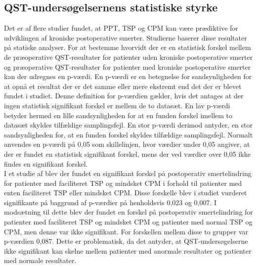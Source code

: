 \subsection{QST-undersøgelsernens statistiske styrke}
Det er af flere studier fundet, at PPT, TSP og CPM kan være prædiktive for udviklingen af kroniske postoperative smerter. \citep{Wylde2016} \citep{Petersen2016} Studierne baserer disse resultater på statiske analyser. For at bestemme hvorvidt der er en statistisk forskel mellem de præoperative QST-resultater for patienter uden kroniske postoperative smerter og præoperative QST-resultater for patienter med kroniske postoperative smerter kan der udregnes en p-værdi. En p-værdi er en betegnelse for sandsynligheden for at opnå et resultat der er det samme eller mere ekstremt end det der er blevet fundet i studiet. Denne definition for p-værdien gælder, hvis det antages at der ingen statistisk signifikant forskel er mellem de to datasæt. En lav p-værdi betyder hermed en lille sandsynligheden for at en funden forskel imellem to datasæt skyldes tilfældige samplingsfejl. En stor p-værdi derimod antyder, en stor sandsynligheden for, at en funden forskel skyldes tilfældige samplingsfejl. Normalt anvendes en p-værdi på 0,05 som skillelinjen, hvor værdier under 0,05 angiver, at der er fundet en statistisk signifikant forskel, mens der ved værdier over 0,05 ikke findes en signifikant forskel. \citep{Zar2010} \\
I et studie af  blev der fundet en signifikant forskel på postoperativ smertelindring for patienter med faciliteret TSP og mindsket CPM i forhold til patienter med enten faciliteret TSP eller mindsket CPM. Disse forskelle blev i studiet vurderet signifikante på baggrund af p-værdier på henholdsvis 0,023 og 0,007. I modsætning til dette blev der fundet en forskel på postoperativ smertelindring for patienter med faciliteret TSP og mindsket CPM og patienter med normal TSP og CPM, men denne var ikke signifikant. For forskellen mellem disse to grupper var p-værdien 0,087. \citep{Petersen2016} Dette er problematisk, da det antyder, at QST-undersøgelserne ikke signifikant kan skelne mellem patienter med anormale resultater og patienter med normale resultater. \\ %
